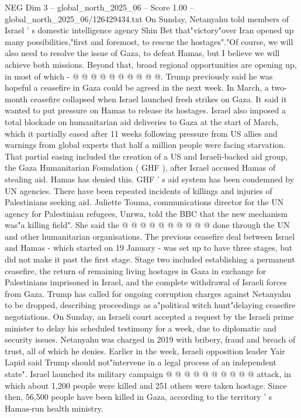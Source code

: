 \begin{textsample}{NEG Dim 3 – global\_north\_2025\_06 – Score 1.00 – global\_north\_2025\_06/126429434.txt}
On Sunday, Netanyahu told members of Israel ' s domestic intelligence agency Shin Bet that"victory"over Iran opened up many possibilities,"first and foremost, to rescue the hostages"."Of course, we will also need to resolve the issue of Gaza, to defeat Hamas, but I believe we will achieve both missions.
Beyond that, broad regional opportunities are opening up, in most of which - @ @ @ @ @ @ @ @ @ @.
Trump previously said he was hopeful a ceasefire in Gaza could be agreed in the next week.
In March, a two-month ceasefire collapsed when Israel launched fresh strikes on Gaza.
It said it wanted to put pressure on Hamas to release its hostages.
Israel also imposed a total blockade on humanitarian aid deliveries to Gaza at the start of March, which it partially eased after 11 weeks following pressure from US allies and warnings from global experts that half a million people were facing starvation.
That partial easing included the creation of a US and Israeli-backed aid group, the Gaza Humanitarian Foundation ( GHF ), after Israel accused Hamas of stealing aid.
Hamas has denied this.
GHF ' s aid system has been condemned by UN agencies.
There have been repeated incidents of killings and injuries of Palestinians seeking aid.
Juliette Touma, communications director for the UN agency for Palestinian refugees, Unrwa, told the BBC that the new mechanism was"a killing field".
She said the @ @ @ @ @ @ @ @ @ @ done through the UN and other humanitarian organisations.
The previous ceasefire deal between Israel and Hamas - which started on 19 January - was set up to have three stages, but did not make it past the first stage.
Stage two included establishing a permanent ceasefire, the return of remaining living hostages in Gaza in exchange for Palestinians imprisoned in Israel, and the complete withdrawal of Israeli forces from Gaza.
Trump has called for ongoing corruption charges against Netanyahu to be dropped, describing proceedings as a"political witch hunt"delaying ceasefire negotiations.
On Sunday, an Israeli court accepted a request by the Israeli prime minister to delay his scheduled testimony for a week, due to diplomatic and security issues.
Netanyahu was charged in 2019 with bribery, fraud and breach of trust, all of which he denies.
Earlier in the week, Israeli opposition leader Yair Lapid said Trump should not"intervene in a legal process of an independent state".
Israel launched its military campaign @ @ @ @ @ @ @ @ @ @ attack, in which about 1,200 people were killed and 251 others were taken hostage.
Since then, 56,500 people have been killed in Gaza, according to the territory ' s Hamas-run health ministry.

\end{textsample}
